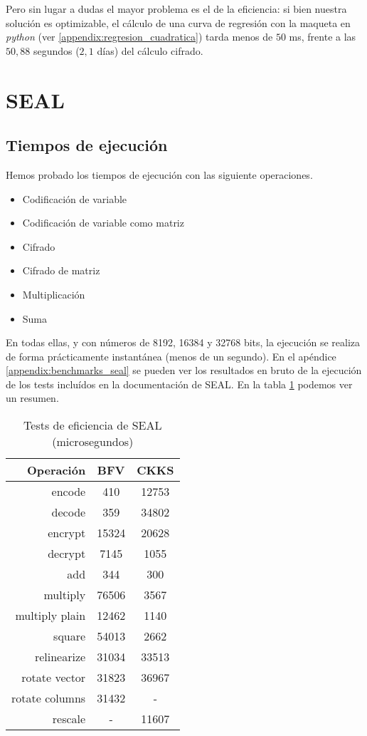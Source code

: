 Pero sin lugar a dudas el mayor problema es el de la eficiencia: si bien nuestra solución es optimizable, el cálculo de una curva de regresión con la maqueta en \textit{python} (ver \ref{appendix:regresion_cuadratica}) tarda menos de $50$ ms, frente a las $50,88$ segundos ($2,1$ días) del cálculo cifrado.

\section{SEAL}

\subsection{Tiempos de ejecución}

Hemos probado los tiempos de ejecución con las siguiente operaciones.

\begin{itemize}
    \item Codificación de variable
    \item Codificación de variable como matriz
    \item Cifrado
    \item Cifrado de matriz
    \item Multiplicación
    \item Suma
\end{itemize}

En todas ellas, y con números de 8192, 16384 y 32768 bits, la ejecución se realiza de forma prácticamente instantánea (menos de un segundo). En el apéndice \ref{appendix:benchmarks_seal} se pueden ver los resultados en bruto de la ejecución de los tests incluídos en la documentación de SEAL. En la tabla \ref{table:benchmarks_seal} podemos ver un resumen.

\begin{table}[]
    \centering
    \begin{tabular}{r | c c}
        Operación   & BFV & CKKS  \\
        \hline \hline
        encode  & 410  & 12753 \\
        decode  & 359  & 34802 \\
        encrypt & 15324 & 20628 \\
        decrypt & 7145  & 1055 \\
        add & 344 & 300 \\
        multiply  & 76506  & 3567 \\
        multiply plain  & 12462  & 1140 \\
        square  & 54013  & 2662 \\
        relinearize & 31034 & 33513 \\
        rotate vector  & 31823  & 36967 \\
        rotate columns  & 31432  & - \\
        rescale  & - & 11607
    \end{tabular}
    \caption{Tests de eficiencia de SEAL (microsegundos)}
    \label{table:benchmarks_seal}
\end{table}

